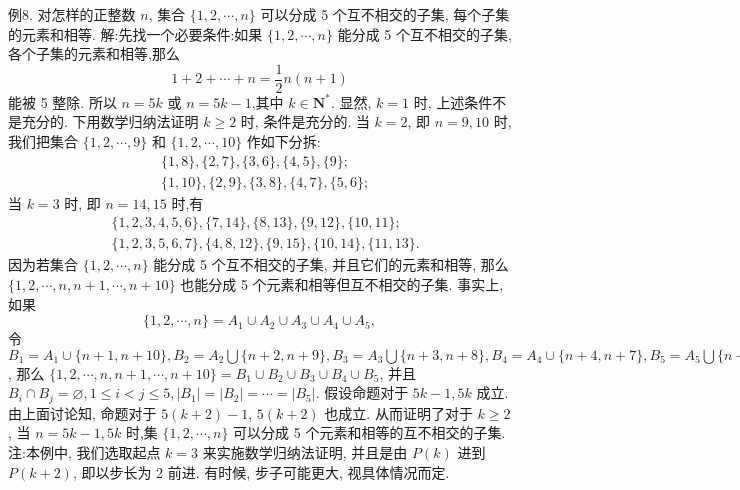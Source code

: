 例8. 对怎样的正整数 $n$, 集合 $\{1,2, \cdots, n\}$ 可以分成 5 个互不相交的子集, 每个子集的元素和相等.
解:先找一个必要条件:如果 $\{1,2, \cdots, n\}$ 能分成 5 个互不相交的子集, 各个子集的元素和相等,那么
$$
1+2+\cdots+n=\frac{1}{2} n(n+1)
$$
能被 5 整除.
所以 $n=5 k$ 或 $n=5 k-1$,其中 $k \in \mathbf{N}^*$.
显然, $k=1$ 时, 上述条件不是充分的.
下用数学归纳法证明 $k \geqslant 2$ 时, 条件是充分的.
当 $k=2$, 即 $n=9,10$ 时, 我们把集合 $\{1,2, \cdots, 9\}$ 和 $\{1,2, \cdots, 10\}$ 作如下分拆:
$$
\begin{aligned}
& \{1,8\},\{2,7\},\{3,6\},\{4,5\},\{9\} ; \\
& \{1,10\},\{2,9\},\{3,8\},\{4,7\},\{5,6\} ;
\end{aligned}
$$
当 $k=3$ 时, 即 $n=14,15$ 时,有
$$
\begin{aligned}
& \{1,2,3,4,5,6\},\{7,14\},\{8,13\},\{9,12\},\{10,11\} ; \\
& \{1,2,3,5,6,7\},\{4,8,12\},\{9,15\},\{10,14\},\{11,13\} .
\end{aligned}
$$
因为若集合 $\{1,2, \cdots, n\}$ 能分成 5 个互不相交的子集, 并且它们的元素和相等, 那么 $\{1,2, \cdots, n, n+1, \cdots, n+10\}$ 也能分成 5 个元素和相等但互不相交的子集.
事实上, 如果
$$
\{1,2, \cdots, n\}=A_1 \cup A_2 \cup A_3 \cup A_4 \cup A_5,
$$
令 $B_1=A_1 \cup\{n+1, n+10\}, B_2=A_2 \bigcup\{n+2, n+9\}, B_3=A_3 \bigcup\{n+ 3, n+8\}, B_4=A_4 \cup\{n+4, n+7\}, B_5=A_5 \bigcup\{n+5, n+6\}$, 那么
$\{1,2, \cdots, n, n+1, \cdots, n+10\}=B_1 \cup B_2 \cup B_3 \cup B_4 \cup B_5$,
并且 $B_i \cap B_j=\varnothing, 1 \leqslant i<j \leqslant 5,\left|B_1\right|=\left|B_2\right|=\cdots=\left|B_5\right|$.
假设命题对于 $5 k-1,5 k$ 成立.
由上面讨论知, 命题对于 $5(k+2)-1$, $5(k+2)$ 也成立.
从而证明了对于 $k \geqslant 2$, 当 $n=5 k-1,5 k$ 时,集 $\{1,2, \cdots, n\}$ 可以分成 5 个元素和相等的互不相交的子集.
注:本例中, 我们选取起点 $k=3$ 来实施数学归纳法证明, 并且是由 $P(k)$ 进到 $P(k+2)$, 即以步长为 2 前进.
有时候, 步子可能更大, 视具体情况而定.



